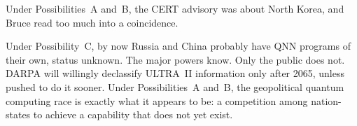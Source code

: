 Under Possibilities~A and~B, the CERT advisory was about North Korea, and Bruce read too much into a coincidence.

Under Possibility~C, by now Russia and China probably have QNN programs of their own, status unknown. The major powers know. Only the public does not. DARPA will willingly declassify ULTRA~II information only after 2065, unless pushed to do it sooner. Under Possibilities~A and~B, the geopolitical quantum computing race is exactly what it appears to be: a competition among nation-states to achieve a capability that does not yet exist.

\chapterreturn
